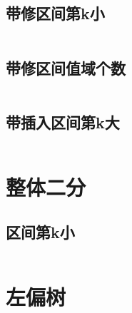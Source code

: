 \documentclass[a4paper,12pt]{article}
\begin{document}
\subsection*{带修区间第k小}
\inputminted[]{c++}{code/luoguP2617.cpp}
\subsection*{带修区间值域个数}
\inputminted[]{c++}{code/19ncI.cpp}
\subsection*{带插入区间第k大}
\inputminted[]{c++}{code/luoguP3332.cpp}
\section*{整体二分}
\subsection*{区间第k小}
\inputminted[]{c++}{code/luoguP3834.cpp}
\newpage
\section{左偏树}





\end{document}
